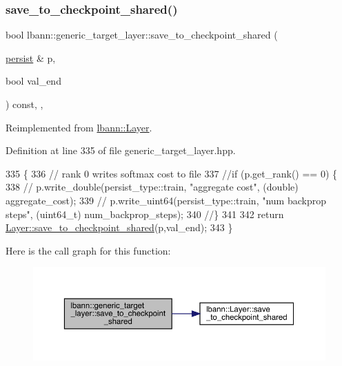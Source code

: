 \subsubsection{\texorpdfstring{save\+\_\+to\+\_\+checkpoint\+\_\+shared()}{save\_to\_checkpoint\_shared()}}
{\footnotesize\ttfamily bool lbann\+::generic\+\_\+target\+\_\+layer\+::save\+\_\+to\+\_\+checkpoint\+\_\+shared (\begin{DoxyParamCaption}\item[{\hyperlink{classlbann_1_1persist}{persist} \&}]{p,  }\item[{bool}]{val\+\_\+end }\end{DoxyParamCaption}) const\hspace{0.3cm}{\ttfamily [inline]}, {\ttfamily [override]}, {\ttfamily [virtual]}}



Reimplemented from \hyperlink{classlbann_1_1Layer_afce0efa0f1c8f3b1c61069536b2fa8cc}{lbann\+::\+Layer}.



Definition at line 335 of file generic\+\_\+target\+\_\+layer.\+hpp.


\begin{DoxyCode}
335                                                                           \{
336     \textcolor{comment}{// rank 0 writes softmax cost to file}
337     \textcolor{comment}{//if (p.get\_rank() == 0) \{}
338       \textcolor{comment}{// p.write\_double(persist\_type::train, "aggregate cost", (double) aggregate\_cost);}
339       \textcolor{comment}{// p.write\_uint64(persist\_type::train, "num backprop steps", (uint64\_t) num\_backprop\_steps);}
340     \textcolor{comment}{//\}}
341 
342     \textcolor{keywordflow}{return} \hyperlink{classlbann_1_1Layer_afce0efa0f1c8f3b1c61069536b2fa8cc}{Layer::save\_to\_checkpoint\_shared}(p,val\_end);
343   \}
\end{DoxyCode}
Here is the call graph for this function\+:\nopagebreak
\begin{figure}[H]
\begin{center}
\leavevmode
\includegraphics[width=350pt]{classlbann_1_1generic__target__layer_a10a0cd1cc77c97e62f14a77ff380559a_cgraph}
\end{center}
\end{figure}
\mbox{\label{classlbann_1_1generic__target__layer_aff8b79ff0392bd78c44a5a4f6b6ef549}} 
